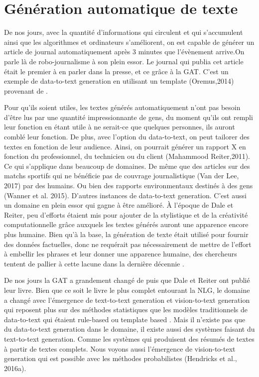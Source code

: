 
\chapter{Génération automatique de texte}

De nos jours, avec la quantité d'informations qui circulent et qui s'accumulent ainsi que les algorithmes et ordinateurs s'améliorent, on est capable de générer un article de journal automatiquement après 3 minutes que l'évènement arrive.On parle là de robo-journalisme à son plein essor. Le journal qui publia cet article était le premier à en parler dans la presse, et ce grâce à la GAT. C'est un exemple de data-to-text generation en utilisant un template (Oremus,2014) provenant de \citep{gatt18}.

Pour qu'ils soient utiles, les textes générés automatiquement n'ont pas besoin d'être lus par une quantité impressionnante de gens, du moment qu'ils ont rempli leur fonction en étant utile à ne serait-ce que quelques personnes, ils auront comblé leur fonction. De plus, avec l'option du data-to-text, on peut tailorer des textes en fonction de leur audience. Ainsi, on pourrait générer un rapport X en fonction du professionnel, du technicien ou du client (Mahammood Reiter,2011). Ce qui s'applique dans beaucoup de domaines. De même que des articles sur des matchs sportifs qui ne bénéficie pas de couvrage journalistique (Van der Lee, 2017) par des humains. Ou bien des rapports environmentaux destinés à des gens (Wanner et al. 2015). D'autres instances de data-to-text generation. C'est aussi un domaine en plein essor qui gagne à être amélioré. À l'époque de Dale et Reiter, peu d'efforts étaient mis pour ajouter de la stylistique et de la créativité computationnelle grâce auxquels les textes générés auront une apparence encore plus humaine. Bien qu'à la base, la génération de texte était utilisé pour fournir des données factuelles, donc ne requérait pas nécessairement de mettre de l'effort à embellir les phrases et leur donner une apparence humaine, des chercheurs tentent de pallier à cette lacune dans la dernière décennie \citep{gatt18}.

De nos jours la \ac{GAT} a grandement changé de puis que Dale et Reiter ont publié leur livre. Bien que ce soit le livre le plus complet entourant la NLG, le domaine a changé avec l'émergence de text-to-text generation et vision-to-text generation qui reposent plus sur des méthodes statistiques que les modèles traditionnels de data-to-text qui étaient rule-based ou template based \citep{gatt18}. Mais il n'existe pas que du data-to-text generation dans le domaine, il existe aussi des systèmes faisant du text-to-text generation. Comme les systèmes qui produisent des résumés de textes à partir de textes complets. Nous voyons aussi l'émergence de vision-to-text generation qui est possible avec les méthodes probabilistes (Hendricks et al., 2016a).


